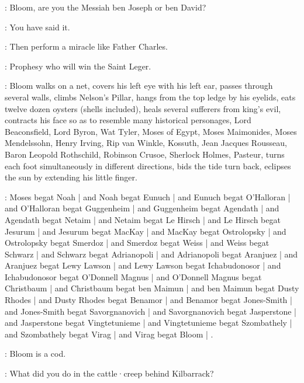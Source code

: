\Voice:
Bloom,
are you the Messiah ben Joseph or ben David?

\Bloom:
You have said it.

\BrotherBuzz[2]:
Then perform a miracle like Father Charles.

\BantamLyons[2]:
Prophesy who will win the Saint Leger.%

:
Bloom walks on a net,
covers his left eye with his left ear,
passes through several walls,
climbs Nelson's Pillar,
hangs from the top ledge by his eyelids,
eats twelve dozen oysters (shells included),
heals several sufferers from king's evil,
contracts his face so as to resemble many historical personages,
Lord Beaconsfield,
Lord Byron,
Wat Tyler,
Moses of Egypt,
Moses Maimonides,
Moses Mendelssohn,
Henry Irving,
Rip van Winkle,
Kossuth,
Jean Jacques Rousseau,
Baron Leopold Rothschild,
Robinson Crusoe,
Sherlock Holmes,
Pasteur,
turns each foot simultaneously in different directions,
bids the tide turn back,
eclipses the sun by extending his little finger.

\begin{omitted}
\Brini:
Moses begat Noah |
and Noah begat Eunuch |
and Eunuch begat O'Halloran |
and O'Halloran begat Guggenheim |
and Guggenheim begat Agendath |
and Agendath begat Netaim |
and Netaim begat Le Hirsch |
and Le Hirsch begat Jesurum |
and Jesurum begat MacKay |
and MacKay begat Ostrolopsky |
and Ostrolopsky begat Smerdoz |
and Smerdoz begat Weiss |
and Weiss begat Schwarz |
and Schwarz begat Adrianopoli |
and Adrianopoli begat Aranjuez |
and Aranjuez begat Lewy Lawson |
and Lewy Lawson begat Ichabudonosor |
and Ichabudonosor begat O'Donnell Magnus |
and O'Donnell Magnus begat Christbaum |
and Christbaum begat ben Maimun |
and ben Maimun begat Dusty Rhodes |
and Dusty Rhodes begat Benamor |
and Benamor begat Jones-Smith |
and Jones-Smith begat Savorgnanovich |
and Savorgnanovich begat Jasperstone |
and Jasperstone begat Vingtetunieme |
and Vingtetunieme begat Szombathely |
and Szombathely begat Virag |
and Virag begat Bloom |
.

\Deadhand:
Bloom is a cod.
\end{omitted}

\Crab:
What did you do in the cattle·creep behind Kilbarrack?

